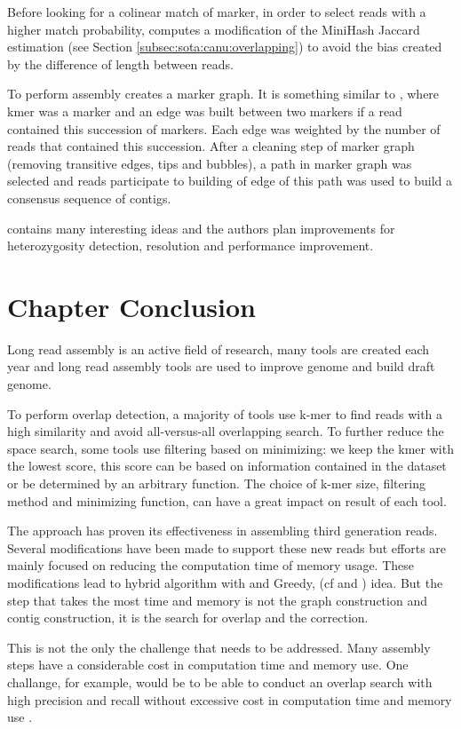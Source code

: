 \documentclass[main]{subfiles}
\begin{document}
Before looking for a colinear match of marker, in order to select reads with a higher match probability, \shasta computes a modification of the MiniHash Jaccard estimation (see Section \ref{subsec:sota:canu:overlapping}) to avoid the bias created by the difference of length between reads.

To perform assembly \shasta creates a marker graph. It is something similar to \DBG, where kmer was a marker and an edge was built between two markers if a read contained this succession of markers. Each edge was weighted by the number of reads that contained this succession. After a cleaning step of marker graph (removing transitive edges, tips and bubbles), a path in marker graph was selected and reads participate to building of edge of this path was used to build a consensus sequence of contigs.

\shasta contains many interesting ideas and the authors plan improvements for heterozygosity detection, resolution and performance improvement.

\section{Chapter Conclusion}

Long read assembly is an active field of research, many tools are created each year and long read assembly tools are used to improve genome and build draft genome.

To perform overlap detection, a majority of tools use k-mer to find reads with a high similarity and avoid all-versus-all overlapping search. To further reduce the space search, some tools use filtering based on minimizing: we keep the kmer with the lowest score, this score can be based on information contained in the dataset or be determined by an arbitrary function. The choice of k-mer size, filtering method and minimizing function, can have a great impact on result of each tool.

The \OLC approach has proven its effectiveness in assembling third generation reads. Several modifications have been made to support these new reads but efforts are mainly focused on reducing the computation time of memory usage. These modifications lead to hybrid \OLC algorithm with \DBG and Greedy, (cf \flye and \wtdbg) idea. But the step that takes the most time and memory is not the graph construction and contig construction, it is the search for overlap and the correction.

This is not the only the challenge that needs to be addressed. Many assembly steps have a considerable cost in computation time and memory use. One challange, for example, would be to be able to conduct an overlap search with high precision and recall without excessive cost in computation time and memory use \cite{bench_ovl}.
\end{document}
